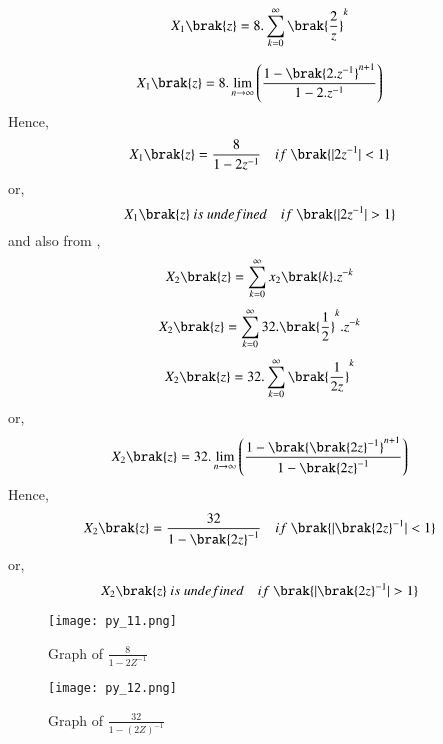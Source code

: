 \documentclass[beamer]{IEEEtran}
\theoremstyle{remark}
\begin{document}
\begin{align}X_1\brak{z}=8.\sum_{k=0}^{\infty} \brak{\frac{2}{z}}^k\end{align}

\begin{align}X_1\brak{z}=8.\lim_{n\to\infty} \left(\frac{1-\brak{2.z^{-1}}^{n+1}}{1-2.z^{-1}}\right)\end{align}
Hence,
\begin{align}
X_1\brak{z}=\frac{8}{1-2z^{-1}}\quad if\ \brak{|2z^{-1}|<1}
\end{align}
or,
$$X_1\brak{z}\ is\ undefined\quad if\ \brak{|2z^{-1}|>1}$$
and also from \brak{\ref{a12}},\\
\begin{align}
    X_2\brak{z}=\sum_{k=0}^{\infty} x_2\brak{k}.z^{-k}
\end{align}
\begin{align}X_2\brak{z}=\sum_{k=0}^{\infty} 32.\brak{\frac{1}{2}}^k.z^{-k}\end{align}
\begin{align}X_2\brak{z}=32.\sum_{k=0}^{\infty} \brak{\frac{1}{2z}}^k\end{align}
or,
\begin{align}X_2\brak{z}=32.\lim_{n\to\infty} \left(\frac{1-\brak{\brak{2z}^{-1}}^{n+1}}{1-{\brak{2z}^{-1}}}\right)\end{align}
Hence,
\begin{align}X_2\brak{z}=\frac{32}{1-{\brak{2z}^{-1}}}\quad if\ \brak{|{\brak{2z}^{-1}}|<1}\end{align}
or,
$$X_2\brak{z}\ is\ undefined\quad if\ \brak{|{\brak{2z}^{-1}}|>1}$$
\begin{figure}[h]
    \centering
    \texttt{[image: py\_11.png]}
    \label{fig:enter-label}
    \caption*{Graph of $\frac{8}{1-2Z^{-1}}$}
\end{figure}
\begin{figure}[h]
    \centering
    \texttt{[image: py\_12.png]}
    \label{fig:enter-label}
    \caption*{Graph of $\frac{32}{1-\left(2Z\right)^{-1}}$}
\end{figure}
\end{document}
